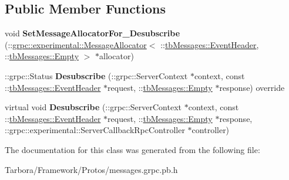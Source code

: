 \subsection*{Public Member Functions}
\begin{DoxyCompactItemize}
\item 
\mbox{\label{classtbMessages_1_1TarboraMessages_1_1ExperimentalWithCallbackMethod__Desubscribe_ad059a36f9d33f1be11be0df69f0e6d2c}} 
void {\bfseries Set\+Message\+Allocator\+For\+\_\+\+Desubscribe} (\+::\hyperlink{classgrpc_1_1experimental_1_1MessageAllocator}{grpc\+::experimental\+::\+Message\+Allocator}$<$ \+::\hyperlink{classtbMessages_1_1EventHeader}{tb\+Messages\+::\+Event\+Header}, \+::\hyperlink{classtbMessages_1_1Empty}{tb\+Messages\+::\+Empty} $>$ $\ast$allocator)
\item 
\mbox{\label{classtbMessages_1_1TarboraMessages_1_1ExperimentalWithCallbackMethod__Desubscribe_a9d1bbd7b9de681b64c7e997b68dcfe46}} 
\+::grpc\+::\+Status {\bfseries Desubscribe} (\+::grpc\+::\+Server\+Context $\ast$context, const \+::\hyperlink{classtbMessages_1_1EventHeader}{tb\+Messages\+::\+Event\+Header} $\ast$request, \+::\hyperlink{classtbMessages_1_1Empty}{tb\+Messages\+::\+Empty} $\ast$response) override
\item 
\mbox{\label{classtbMessages_1_1TarboraMessages_1_1ExperimentalWithCallbackMethod__Desubscribe_abbcf53fac3facf9bc424c716a2f3d9d7}} 
virtual void {\bfseries Desubscribe} (\+::grpc\+::\+Server\+Context $\ast$context, const \+::\hyperlink{classtbMessages_1_1EventHeader}{tb\+Messages\+::\+Event\+Header} $\ast$request, \+::\hyperlink{classtbMessages_1_1Empty}{tb\+Messages\+::\+Empty} $\ast$response, \+::grpc\+::experimental\+::\+Server\+Callback\+Rpc\+Controller $\ast$controller)
\end{DoxyCompactItemize}


The documentation for this class was generated from the following file\+:\begin{DoxyCompactItemize}
\item 
Tarbora/\+Framework/\+Protos/messages.\+grpc.\+pb.\+h\end{DoxyCompactItemize}
